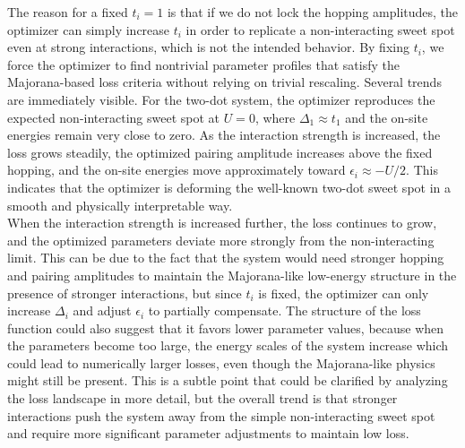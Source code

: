 The reason for a fixed $t_i = 1$ is that if we do not lock the hopping amplitudes, the optimizer can simply increase $t_i$ in order to replicate a non-interacting sweet spot even at strong interactions, which is not the intended behavior. By fixing $t_i$, we force the optimizer to find nontrivial parameter profiles that satisfy the Majorana-based loss criteria without relying on trivial rescaling.
Several trends are immediately visible. For the two-dot system, the optimizer reproduces the expected non-interacting sweet spot at $U=0$, where $\Delta_1 \approx t_1$ and the on-site energies remain very close to zero. As the interaction strength is increased, the loss grows steadily, the optimized pairing amplitude increases above the fixed hopping, and the on-site energies move approximately toward $\epsilon_i \approx -U/2$. This indicates that the optimizer is deforming the well-known two-dot sweet spot in a smooth and physically interpretable way.\\ 
When the interaction strength is increased further, the loss continues to grow, and the optimized parameters deviate more strongly from the non-interacting limit. This can be due to the fact that the system would need stronger hopping and pairing amplitudes to maintain the Majorana-like low-energy structure in the presence of stronger interactions, but since $t_i$ is fixed, the optimizer can only increase $\Delta_i$ and adjust $\epsilon_i$ to partially compensate. The structure of the loss function could also suggest that it favors lower parameter values, because when the parameters become too large, the energy scales of the system increase which could lead to numerically larger losses, even though the Majorana-like physics might still be present. This is a subtle point that could be clarified by analyzing the loss landscape in more detail, but the overall trend is that stronger interactions push the system away from the simple non-interacting sweet spot and require more significant parameter adjustments to maintain low loss.\\

